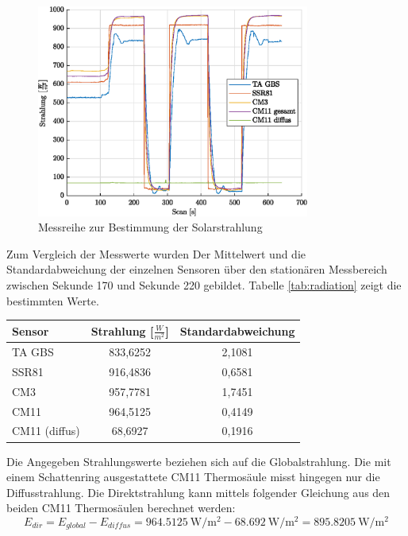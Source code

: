 \begin{figure}[H]
	\centering
	\includegraphics[width=0.8\textwidth]{../DATA/Messreihe_Strahlung.eps}
	\caption[Messreihe zur Bestimmung der Solarstrahlung]{Messreihe zur Bestimmung der Solarstrahlung}
	\label{fig:radiation}
\end{figure}
Zum Vergleich der Messwerte wurden Der Mittelwert und die Standardabweichung der einzelnen Sensoren über den stationären Messbereich zwischen Sekunde 170 und Sekunde 220 gebildet. Tabelle \ref{tab:radiation} zeigt die bestimmten Werte.
\begin{center}
\begin{tabular}{l|c|c}
	\label{tab:radiation}
	
	\textbf{Sensor} & \textbf{Strahlung [$\frac{W}{m^2}$]} & \textbf{Standardabweichung}\\
	\hline
	TA GBS & 833,6252 & 2,1081\\
	SSR81 & 916,4836 & 0,6581\\
	CM3 & 957,7781 & 1,7451\\
	CM11 & 964,5125 & 0,4149\\
	CM11 (diffus) & 68,6927 & 0,1916
\end{tabular} 
\end{center}

Die Angegeben Strahlungswerte beziehen sich auf die Globalstrahlung. Die mit einem Schattenring ausgestattete CM11 Thermosäule misst hingegen nur die Diffusstrahlung. Die Direktstrahlung kann mittels folgender Gleichung aus den beiden CM11 Thermosäulen berechnet werden:
\begin{equation}
	\label{eq:Edir}
	E_{dir}=E_{global}-E_{diffus}=\SI{964.5125}{\watt\per\square\meter}-\SI{68.692}{\watt\per\square\meter} = \SI{895.8205}{\watt\per\square\meter}
\end{equation}


